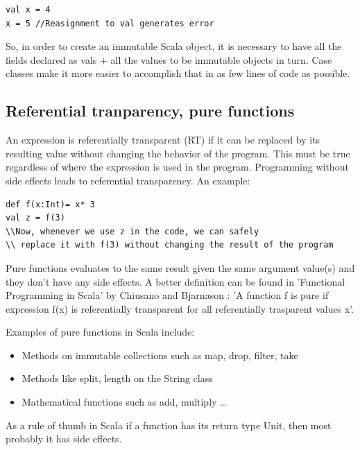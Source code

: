 \documentclass{article}
\begin{document}
\begin{lstlisting} 
val x = 4
x = 5 //Reasignment to val generates error
\end{lstlisting}


So, in order to create an immutable Scala object, it is necessary to have all the fields declared as vals + all the values to be immutable objects in turn. Case classes make it more easier to accomplish that in as few lines of code as possible.

\subsection {Referential tranparency, pure functions}
An expression is referentially transparent (RT) if it can be replaced by its resulting value without changing the behavior of the program. This must be true regardless of where the expression is used in the program. Programming without side effects leads to referential transparency. An example:

\begin{lstlisting}
def f(x:Int)= x* 3
val z = f(3)
\\Now, whenever we use z in the code, we can safely
\\ replace it with f(3) without changing the result of the program
\end{lstlisting}

Pure functions evaluates to the same result given the same argument value(s) and they don't have any side effects. A better definition can be found in 'Functional Programming in Scala' by Chiusano and Bjarnason : 'A function f is pure if expression f(x) is referentially transparent for all referentially trasparent values x'.\par
Examples of pure functions in Scala include:
\begin{itemize}

 \item Methods on immutable collections such as map, drop, filter, take
 \item Methods like split, length on the String class
 \item Mathematical functions such as add, multiply \ldots
\end{itemize}
As a rule of thumb in Scala if a function has its return type Unit, then most probably it has side effects. 
\end{document}
